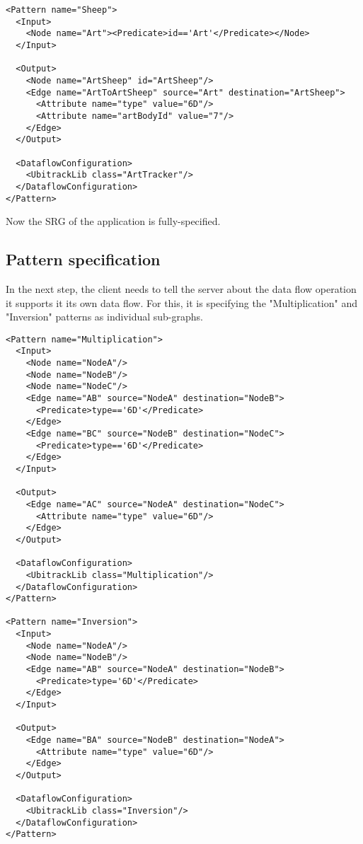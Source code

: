 \documentclass[11pt]{article}
\begin{document}
\begin{Verbatim}[fontsize=\footnotesize,tabsize=2] 
<Pattern name="Sheep">
  <Input>
    <Node name="Art"><Predicate>id=='Art'</Predicate></Node>
  </Input>

  <Output>
    <Node name="ArtSheep" id="ArtSheep"/>
    <Edge name="ArtToArtSheep" source="Art" destination="ArtSheep">
      <Attribute name="type" value="6D"/>
      <Attribute name="artBodyId" value="7"/>
    </Edge>
  </Output>

  <DataflowConfiguration>
    <UbitrackLib class="ArtTracker"/>
  </DataflowConfiguration>
</Pattern>
\end{Verbatim} 

Now the SRG of the application is fully-specified.

\subsection{Pattern specification}

In the next step, the client needs to tell
the server about the data flow operation it supports it its own data flow. For
this, it is specifying the "Multiplication" and "Inversion" patterns as
individual sub-graphs.

\begin{Verbatim}[fontsize=\footnotesize,tabsize=2] 
<Pattern name="Multiplication">
  <Input>
    <Node name="NodeA"/>
    <Node name="NodeB"/>
    <Node name="NodeC"/>
    <Edge name="AB" source="NodeA" destination="NodeB">
      <Predicate>type=='6D'</Predicate>
    </Edge>
    <Edge name="BC" source="NodeB" destination="NodeC">
      <Predicate>type=='6D'</Predicate>
    </Edge>
  </Input>

  <Output>
    <Edge name="AC" source="NodeA" destination="NodeC">
      <Attribute name="type" value="6D"/>
    </Edge>
  </Output>

  <DataflowConfiguration>
    <UbitrackLib class="Multiplication"/>
  </DataflowConfiguration>
</Pattern>

<Pattern name="Inversion">
  <Input>
    <Node name="NodeA"/>
    <Node name="NodeB"/>
    <Edge name="AB" source="NodeA" destination="NodeB">
      <Predicate>type='6D'</Predicate>
    </Edge>
  </Input>

  <Output>
    <Edge name="BA" source="NodeB" destination="NodeA">
      <Attribute name="type" value="6D"/>
    </Edge>
  </Output>
 
  <DataflowConfiguration>
    <UbitrackLib class="Inversion"/>
  </DataflowConfiguration>
</Pattern>
\end{Verbatim}
\end{document}
